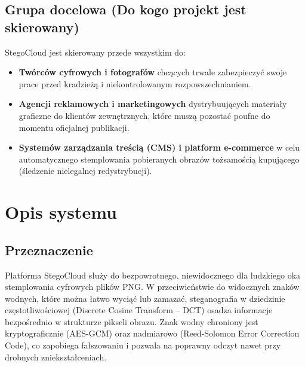 \documentclass[12pt,a4paper]{article}
\begin{document}
\subsection{Grupa docelowa (Do kogo projekt jest skierowany)}
StegoCloud jest skierowany przede wszystkim do:
\begin{itemize}
    \item \textbf{Twórców cyfrowych i fotografów} chcących trwale zabezpieczyć swoje prace przed kradzieżą i niekontrolowanym rozpowszechnianiem.
    \item \textbf{Agencji reklamowych i marketingowych} dystrybuujących materiały graficzne do klientów zewnętrznych, które muszą pozostać poufne do momentu oficjalnej publikacji.
    \item \textbf{Systemów zarządzania treścią (CMS) i platform e-commerce} w celu automatycznego stemplowania pobieranych obrazów tożsamością kupującego (śledzenie nielegalnej redystrybucji).
\end{itemize}

\newpage

\section{Opis systemu}

\subsection{Przeznaczenie}
Platforma StegoCloud służy do bezpowrotnego, niewidocznego dla ludzkiego oka stemplowania cyfrowych plików PNG. W przeciwieństwie do widocznych znaków wodnych, które można łatwo wyciąć lub zamazać, steganografia w dziedzinie częstotliwościowej (Discrete Cosine Transform -- DCT) osadza informacje bezpośrednio w strukturze pikseli obrazu. Znak wodny chroniony jest kryptograficznie (AES-GCM) oraz nadmiarowo (Reed-Solomon Error Correction Code), co zapobiega fałszowaniu i pozwala na poprawny odczyt nawet przy drobnych zniekształceniach.
\end{document}
